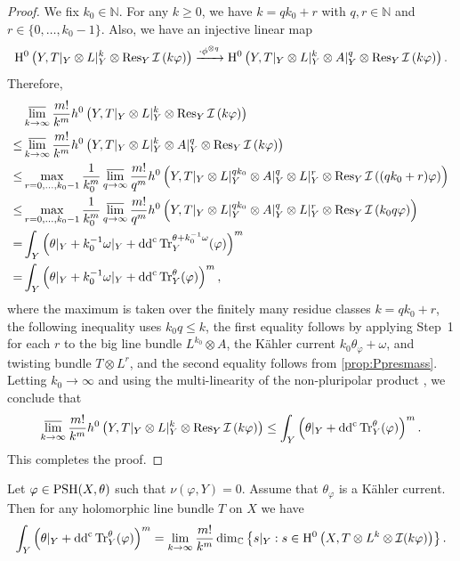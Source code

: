 \begin{proof}
We fix $k_0 \in \mathbb{N}$. For any $k \geq 0$, we have $k = q k_0 + r$ with $q,r \in \mathbb{N}$ and $r \in \{0,\ldots, k_0-1\}$. Also, we have an injective linear map
\[
\mathrm{H}^0\left(Y,T|_Y \otimes L|_Y^k \otimes \operatorname{Res}_Y\mathcal{I}\left(k \varphi\right)\right)\xrightarrow{\cdot \phi^{\otimes q}} \mathrm{H}^0\left(Y,T|_Y\otimes L|_Y^k \otimes A|_Y^q \otimes \operatorname{Res}_Y\mathcal{I}\left(k \varphi\right)\right).
\]
Therefore,
\[
\begin{aligned}
 &\varlimsup_{k\to\infty} \frac{m!}{k^m} h^0\left(Y,T|_Y \otimes L|_Y^k \otimes \operatorname{Res}_Y\mathcal{I}\left(k\varphi\right)\right)  \\
 \leq & \varlimsup_{k\to\infty} \frac{m!}{k^m} h^0\left(Y,T|_Y \otimes L|_Y^k \otimes A|_Y^q\otimes \operatorname{Res}_Y\mathcal{I}\left(k\varphi\right)\right) \\
 \leq & \max_{r=0,\ldots,k_0-1}\frac{1}{k_0^m} \varlimsup_{q\to\infty} \frac{m!}{q^m} h^0\left(Y,T|_Y\otimes L|_Y^{q k_0} \otimes A|_Y^q\otimes L|_Y^{r}\otimes \operatorname{Res}_Y\mathcal{I}\left((qk_0+r)\varphi\right)\right)\\
 \leq & \max_{r=0,\ldots,k_0-1}\frac{1}{k_0^m} \varlimsup_{q\to\infty} \frac{m!}{q^m} h^0\left(Y,T|_Y\otimes L|_Y^{q k_0} \otimes A|_Y^q\otimes L|_Y^{r}\otimes \operatorname{Res}_Y\mathcal{I}\left(k_0q \varphi\right)\right)\\
 = & \int_Y \left(\theta|_Y+k_0^{-1}\omega|_Y+\mathrm{dd}^{\mathrm{c}} \operatorname{Tr}_Y^{\theta+k_0^{-1}\omega}(\varphi)\right)^m\\
 =& \int_Y \left(\theta|_Y+k_0^{-1}\omega|_Y+\mathrm{dd}^{\mathrm{c}} \operatorname{Tr}_Y^{\theta}(\varphi)\right)^m,
 \end{aligned}
\]
where the maximum is taken over the finitely many residue classes $k=qk_0+r$, the following inequality uses $k_0q\leq k$, the first equality follows by applying Step~1 for each $r$ to the big line bundle $L^{k_0} \otimes A$, the Kähler current $k_0 \theta_{\varphi} + \omega$, and twisting bundle $T \otimes L^r$, and the second equality follows from \cref{prop:Ppresmass}. Letting $k_0\to\infty$ and using the multi-linearity of the non-pluripolar product , we conclude that
\[
\varlimsup_{k\to\infty} \frac{m!}{k^m}  h^0\left(Y,T|_Y \otimes L|_Y^k \otimes \operatorname{Res}_Y\mathcal{I}\left(k \varphi\right)\right)\leq \int_Y \left(\theta|_Y+\mathrm{dd}^{\mathrm{c}} \operatorname{Tr}_Y^{\theta}(\varphi)\right)^m.
\]
This completes the proof.
\end{proof}



\begin{theorem}\label{thm:rest_volume_2} Let $\varphi\in \mathrm{PSH}(X,\theta)$ such that $\nu(\varphi,Y) =0$. Assume that $\theta_{\varphi}$ is a Kähler current.
Then for any holomorphic line bundle $T$ on $X$ we have
\[
    \int_Y \left(\theta|_Y+\mathrm{dd}^{\mathrm{c}} \operatorname{Tr}_Y^{\theta}(\varphi)\right)^m  = \lim_{k \to \infty} \frac{m!}{k^m} \dim_{\mathbb C}\left\{ s|_Y:  s\in \mathrm{H}^0\left(X,T\otimes L^k \otimes \mathcal{I}(k\varphi)\right)\right\}.
\]
\end{theorem}

